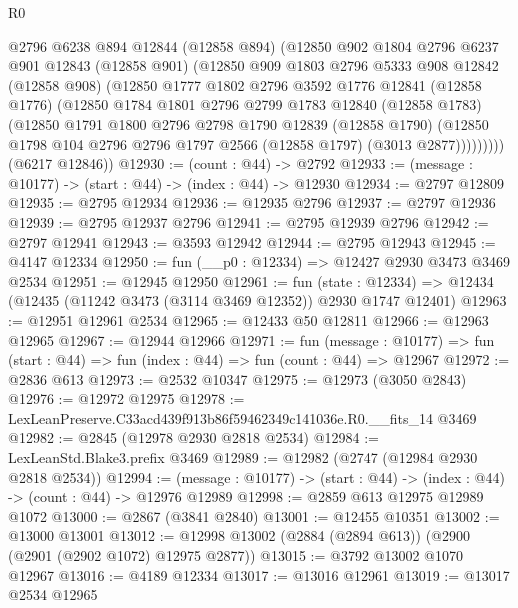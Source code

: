 \begin{lexlean}{R0}
\begin{coremodule}
          @2796
          @6238
          @894
          @12844
          (@12858 @894)
          (@12850
            @902
            @1804
            @2796
            @6237
            @901
            @12843
            (@12858 @901)
            (@12850
              @909
              @1803
              @2796
              @5333
              @908
              @12842
              (@12858 @908)
              (@12850
                @1777
                @1802
                @2796
                @3592
                @1776
                @12841
                (@12858 @1776)
                (@12850
                  @1784
                  @1801
                  @2796
                  @2799
                  @1783
                  @12840
                  (@12858 @1783)
                  (@12850
                    @1791
                    @1800
                    @2796
                    @2798
                    @1790
                    @12839
                    (@12858 @1790)
                    (@12850 @1798 @104 @2796 @2796 @1797 @2566 (@12858 @1797) (@3013 @2877)))))))))
      (@6217 @12846))
@12930 := (count : @44) -> @2792
@12933 := (message : @10177) -> (start : @44) -> (index : @44) -> @12930
@12934 := @2797 @12809
@12935 := @2795 @12934
@12936 := @12935 @2796
@12937 := @2797 @12936
@12939 := @2795 @12937 @2796
@12941 := @2795 @12939 @2796
@12942 := @2797 @12941
@12943 := @3593 @12942
@12944 := @2795 @12943
@12945 := @4147 @12334
@12950 := fun (__p0 : @12334) => @12427 @2930 @3473 @3469 @2534
@12951 := @12945 @12950
@12961 := fun (state : @12334) =>
  @12434 (@12435 (@11242 @3473 (@3114 @3469 @12352)) @2930 @1747 @12401)
@12963 := @12951 @12961 @2534
@12965 := @12433 @50 @12811
@12966 := @12963 @12965
@12967 := @12944 @12966
@12971 := fun (message : @10177) =>
  fun (start : @44) => fun (index : @44) => fun (count : @44) => @12967
@12972 := @2836 @613
@12973 := @2532 @10347
@12975 := @12973 (@3050 @2843)
@12976 := @12972 @12975
@12978 := LexLeanPreserve.C33acd439f913b86f59462349c141036e.R0.__fits_14 @3469
@12982 := @2845 (@12978 @2930 @2818 @2534)
@12984 := LexLeanStd.Blake3.prefix @3469
@12989 := @12982 (@2747 (@12984 @2930 @2818 @2534))
@12994 := (message : @10177) -> (start : @44) -> (index : @44) -> (count : @44) -> @12976 @12989
@12998 := @2859 @613 @12975 @12989 @1072
@13000 := @2867 (@3841 @2840)
@13001 := @12455 @10351
@13002 := @13000 @13001
@13012 := @12998 @13002 (@2884 (@2894 @613)) (@2900 (@2901 (@2902 @1072) @12975 @2877))
@13015 := @3792 @13002 @1070 @12967
@13016 := @4189 @12334
@13017 := @13016 @12961
@13019 := @13017 @2534 @12965

\end{coremodule}
\end{lexlean}
